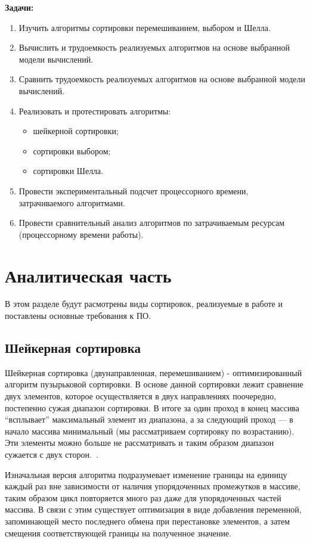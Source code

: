\documentclass[12pt]{report}
\begin{document}
    \textbf{Задачи:}
    \begin{enumerate}
        \item Изучить алгоритмы сортировки перемешиванием, выбором и Шелла.
        \item Вычислить и трудоемкость реализуемых алгоритмов на основе выбранной модели вычислений.
        \item Сравнить трудоемкость реализуемых алгоритмов на основе выбранной модели вычислений.
        \item Реализовать и протестировать алгоритмы:
        \begin{itemize}
            \item шейкерной сортировки;
            \item сортировки выбором;
            \item сортировки Шелла.
        \end{itemize}
    	\item Провести экспериментальный подсчет процессорного времени, затрачиваемого алгоритмами.
        \item Провести сравнительный анализ алгоритмов по затрачиваемым ресурсам (процессорному времени работы).
    \end{enumerate}
    \newpage


    \chapter{Аналитическая часть}
    
	В этом разделе будут расмотрены виды сортировок, реализуемые в работе
	и поставлены основные требования к ПО.

    \section{Шейкерная сортировка}
    Шейкерная сортировка (двунаправленная, перемешиванием) - оптимизированный алгоритм пузырьковой сортировки.
    В основе данной сортировки лежит сравнение двух элементов,
    которое осуществляется в двух направлениях поочередно, постепенно сужая диапазон сортировки.
    В итоге за один проход в конец массива “всплывает” максимальный элемент из диапазона,
    а за следующий проход — в начало массива минимальный (мы рассматриваем сортировку по возрастанию).
    Эти элементы можно больше не рассматривать и таким образом диапазон сужается с двух сторон.~\cite{Shaker}.

    Изначальная версия алгоритма подразумевает изменение границы на единицу каждый раз
    вне зависимости от наличия упорядоченных промежутков в массиве,
    таким образом цикл повторяется много раз даже для упорядоченных частей массива.
    В связи с этим существует оптимизация в виде добавления переменной,
    запоминающей место последнего обмена при перестановке элементов,
    а затем смещения соответствующей границы на полученное значение.
\end{document}

